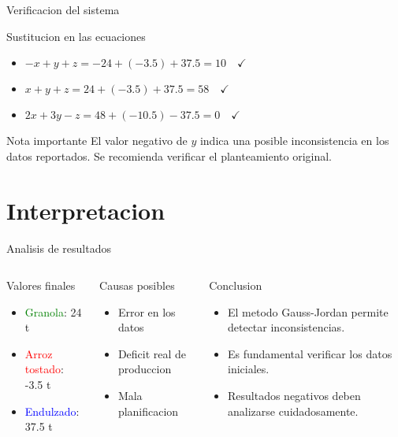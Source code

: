 \documentclass{beamer}
\begin{document}
\begin{frame}{Verificacion del sistema}
\begin{block}{Sustitucion en las ecuaciones}
\scriptsize
\begin{itemize}
\item $-x + y + z = -24 + (-3.5) + 37.5 = 10 \quad \checkmark$
\item $x + y + z = 24 + (-3.5) + 37.5 = 58 \quad \checkmark$
\item $2x + 3y - z = 48 + (-10.5) - 37.5 = 0 \quad \checkmark$
\end{itemize}
\end{block}

\begin{alertblock}{Nota importante}
El valor negativo de $y$ indica una posible inconsistencia en los datos reportados. Se recomienda verificar el planteamiento original.
\end{alertblock}
\end{frame}

\section{Interpretacion}
\begin{frame}{Analisis de resultados}
\begin{columns}[T]
\begin{block}{Valores finales}
\begin{itemize}
\item \textcolor{green}{Granola}: 24 t
\item \textcolor{red}{Arroz tostado}: -3.5 t
\item \textcolor{blue}{Endulzado}: 37.5 t
\end{itemize}
\end{block}

\begin{block}{Causas posibles}
\begin{itemize}
\item Error en los datos
\item Deficit real de produccion
\item Mala planificacion
\end{itemize}
\end{block}

\begin{alertblock}{Conclusion}
\begin{itemize}
\item El metodo Gauss-Jordan permite detectar inconsistencias.
\item Es fundamental verificar los datos iniciales.
\item Resultados negativos deben analizarse cuidadosamente.
\end{itemize}
\end{alertblock}
\end{columns}
\end{frame}
\end{document}
